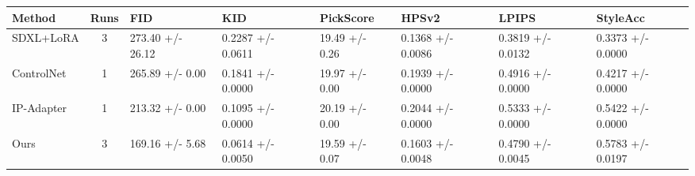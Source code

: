 \begin{tabular}{lcllllll}
\toprule
Method & Runs & FID & KID & PickScore & HPSv2 & LPIPS & StyleAcc \\
\midrule
SDXL+LoRA & 3 & 273.40 +/- 26.12 & 0.2287 +/- 0.0611 & 19.49 +/- 0.26 & 0.1368 +/- 0.0086 & 0.3819 +/- 0.0132 & 0.3373 +/- 0.0000 \\
ControlNet & 1 & 265.89 +/- 0.00 & 0.1841 +/- 0.0000 & 19.97 +/- 0.00 & 0.1939 +/- 0.0000 & 0.4916 +/- 0.0000 & 0.4217 +/- 0.0000 \\
IP-Adapter & 1 & 213.32 +/- 0.00 & 0.1095 +/- 0.0000 & 20.19 +/- 0.00 & 0.2044 +/- 0.0000 & 0.5333 +/- 0.0000 & 0.5422 +/- 0.0000 \\
Ours & 3 & 169.16 +/- 5.68 & 0.0614 +/- 0.0050 & 19.59 +/- 0.07 & 0.1603 +/- 0.0048 & 0.4790 +/- 0.0045 & 0.5783 +/- 0.0197 \\
\bottomrule
\end{tabular}
